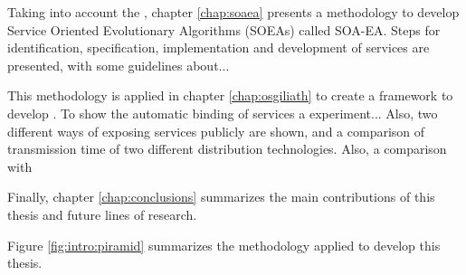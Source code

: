 Taking into account the , chapter \ref{chap:soaea} presents a methodology to develop Service Oriented Evolutionary Algorithms (SOEAs) called SOA-EA. Steps for identification, specification, implementation and development of services are presented, with some guidelines about...

This methodology is applied in chapter \ref{chap:osgiliath} to create a framework to develop . To show the automatic binding of services a experiment... Also, two different ways of exposing services publicly are shown, and a comparison of transmission time of two different distribution technologies. Also, a comparison with 

Finally, chapter \ref{chap:conclusions} summarizes the main contributions of this thesis and future lines of research.

Figure \ref{fig:intro:piramid} summarizes the methodology applied to develop this thesis.

